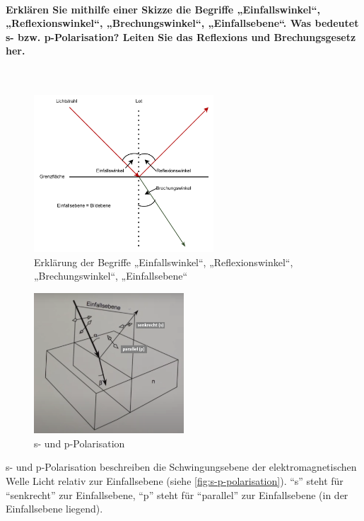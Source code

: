 \documentclass[a4paper, 11pt, ngerman, parskip=half-]{scrartcl}
\newcommand{\myparagraph}[1]{\paragraph{#1}\mbox{}\\}
\begin{document}
\myparagraph{Erklären Sie mithilfe einer Skizze die Begriffe „Einfallswinkel“, „Reflexionswinkel“, „Brechungswinkel“, „Einfallsebene“. Was bedeutet s- bzw. p-Polarisation? Leiten Sie das Reflexions und Brechungsgesetz her.}
%
\begin{figure}[H]
    \centering
    \begin{samepage}
        \includegraphics[width=0.6\textwidth]{image/15/brechung_reflexion.pdf}
        \caption{Erklärung der Begriffe „Einfallswinkel“, „Reflexionswinkel“, „Brechungswinkel“, „Einfallsebene“}
        \label{fig:reflexion_brechung}
    \end{samepage}
\end{figure}
%
\begin{figure}[!h]
    \centering
    \begin{samepage}
        \includegraphics[width=0.5\textwidth]{image/15/p_s_polarisation.png}
        \caption{s- und p-Polarisation}
        \label{fig:s-p-polarisation}
    \end{samepage}
\end{figure}
%
s- und p-Polarisation beschreiben die Schwingungsebene der elektromagnetischen Welle Licht relativ zur Einfallsebene (siehe \autoref{fig:s-p-polarisation}). \enquote{s} steht für \enquote{senkrecht} zur Einfallsebene, \enquote{p} steht für \enquote{parallel} zur Einfallsebene (in der Einfallsebene liegend).
%
\end{document}
